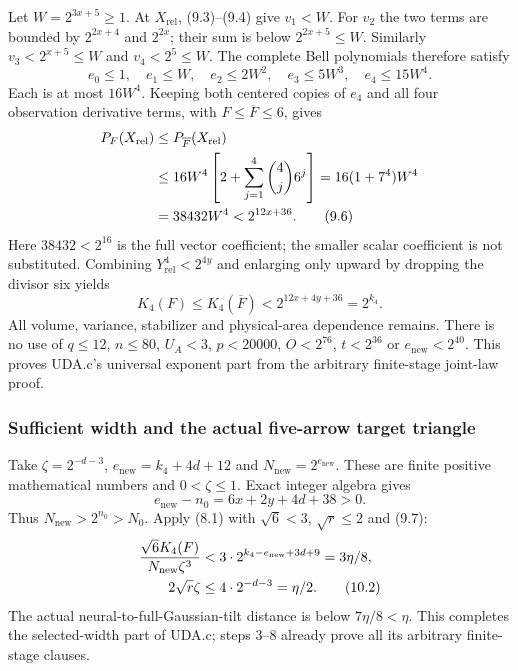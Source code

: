 Let $W=2^{3x+5}\ge1$. At $X_{\mathrm{rel}}$, (9.3)--(9.4) give $v_1<W$.
For $v_2$ the two terms are bounded by $2^{2x+4}$ and $2^{2x}$; their
sum is below $2^{2x+5}\le W$. Similarly $v_3<2^{x+5}\le W$ and
$v_4<2^5\le W$. The complete Bell polynomials therefore satisfy
\[
 e_0\le1,\quad e_1\le W,\quad e_2\le2W^2,\quad e_3\le5W^3,
 \quad e_4\le15W^4.
\]
Each is at most $16W^4$. Keeping both centered copies of $e_4$ and all
four observation derivative terms, with $F\le\overline F\le6$, gives
\begin{align}
 P_F(X_{\mathrm{rel}})&\le P_{\overline F}(X_{\mathrm{rel}})\notag\\
 &\le16W^4\left[2+\sum_{j=1}^4\binom4j6^j\right]
 =16(1+7^4)W^4\notag\\
 &=38432W^4<2^{12x+36}.\tag{9.6}
\end{align}
Here $38432<2^{16}$ is the full vector coefficient; the smaller scalar
coefficient is not substituted. Combining $Y_{\mathrm{rel}}^4<2^{4y}$
and enlarging only upward by dropping the divisor six yields
\begin{equation}
 K_4(F)\le K_4(\overline F)<2^{12x+4y+36}=2^{k_4}.\tag{9.7}
\end{equation}
All volume, variance, stabilizer and physical-area dependence remains.
There is no use of $q\le12$, $n\le80$, $U_A<3$, $p<20000$,
$O<2^{76}$, $t<2^{36}$ or $e_{\mathrm{new}}<2^{40}$.
This proves UDA.c's universal exponent part from the arbitrary finite-stage
joint-law proof.

\subsubsection{Sufficient width and the actual five-arrow target triangle}
Take $\zeta=2^{-d-3}$, $e_{\mathrm{new}}=k_4+4d+12$ and
$N_{\mathrm{new}}=2^{e_{\mathrm{new}}}$. These are finite positive
mathematical numbers and $0<\zeta\le1$. Exact integer algebra gives
\begin{equation}
 e_{\mathrm{new}}-n_0=6x+2y+4d+38>0.\tag{10.1}
\end{equation}
Thus $N_{\mathrm{new}}>2^{n_0}>N_0$. Apply (8.1) with $\sqrt6<3$,
$\sqrt r\le2$ and (9.7):
\begin{align}
 \frac{\sqrt6K_4(F)}{N_{\mathrm{new}}\zeta^3}
 &<3\cdot2^{k_4-e_{\mathrm{new}}+3d+9}=3\eta/8,\notag\\
 2\sqrt r\zeta&\le4\cdot2^{-d-3}=\eta/2.\tag{10.2}
\end{align}
The actual neural-to-full-Gaussian-tilt distance is below $7\eta/8<\eta$.
This completes the selected-width part of UDA.c; steps 3--8 already prove
all its arbitrary finite-stage clauses.

